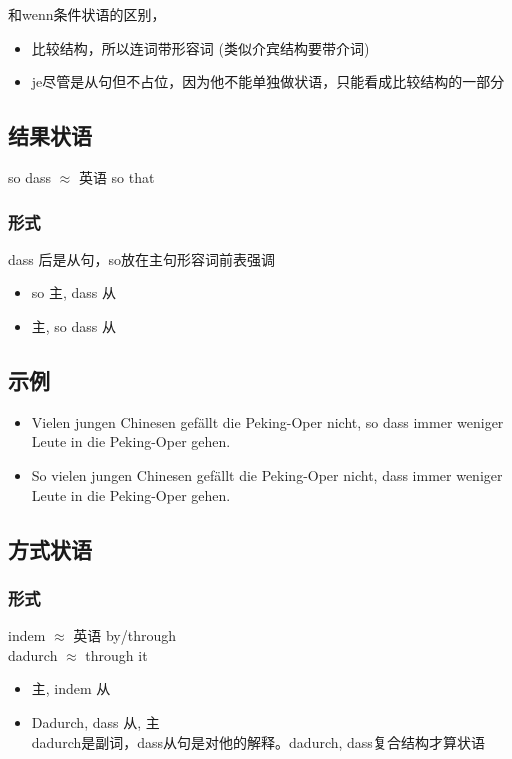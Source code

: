 和wenn条件状语的区别，
\begin{itemize}
    \item 比较结构，所以连词带形容词 (类似介宾结构要带介词)
    \item je尽管是从句但不占位，因为他不能单独做状语，只能看成比较结构的一部分
\end{itemize}

\subsection{结果状语}
so dass $\approx$ 英语 so that
\subsubsection{形式}
dass 后是从句，so放在主句形容词前表强调
\begin{itemize}
    \item so 主, dass 从
    \item 主, so dass 从
\end{itemize}

\subsection{示例}
\begin{itemize}
    \item Vielen jungen Chinesen gefällt die Peking-Oper nicht, so dass immer weniger Leute in die Peking-Oper gehen.
    \item So vielen jungen Chinesen gefällt die Peking-Oper nicht, dass immer weniger Leute in die Peking-Oper gehen.
\end{itemize}

\subsection{方式状语}
\subsubsection{形式}
indem $\approx$ 英语 by/through \\
dadurch $\approx$ through it
\begin{itemize}
    \item 主, indem 从
    \item Dadurch, dass 从, 主 \\
          dadurch是副词，dass从句是对他的解释。dadurch, dass复合结构才算状语
\end{itemize}

